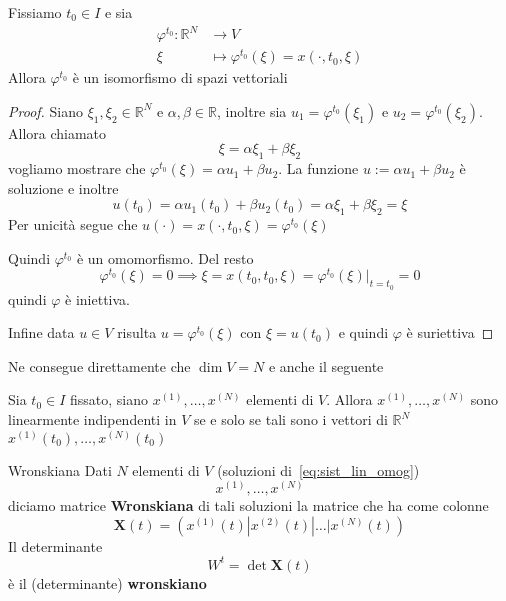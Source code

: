 \begin{proposition}
    Fissiamo \(t_{0} \in I\) e sia 
    \begin{align*}
        \varphi^{t_{0}}: \mathbb{R}^{N} &\longrightarrow V \\
        \xi &\longmapsto \varphi^{t_{0}}(\xi) = x{(\cdot , t_{0}, \xi)}
    \end{align*}
    Allora \(\varphi ^{t_{0}}\) è un isomorfismo di spazi vettoriali
\end{proposition}
\begin{proof}
    Siano \(\xi_{1}, \xi_{2} \in \mathbb{R}^{N}\) e \(\alpha, \beta \in
    \mathbb{R}\), inoltre sia \(u_{1} = \varphi ^{t_{0}}{(\xi_{1})}\) e \(u_{2}
    = \varphi ^{t_{0}}{(\xi_{2})}\). Allora chiamato
    \[
      \xi = \alpha \xi_{1} + \beta\xi_{2}
    \]
    vogliamo mostrare che \(\varphi ^{t_{0}}{(\xi)} = \alpha u_{1} + \beta
    u_{2}\). La funzione \(u := \alpha u_{1} + \beta u_{2}\) è soluzione e
    inoltre
    \[
      u{(t_{0})} = \alpha u_{1}{(t_{0})} + \beta u_{2}{(t_{0})} = \alpha
      \xi_{1} + \beta \xi_{2} = \xi
    \]
    Per unicità segue che \(u{(\cdot )} = x{(\cdot , t_{0}, \xi)} = \varphi
    ^{t_{0}}{(\xi)}\) 

    Quindi \(\varphi ^{t_{0}}\) è un omomorfismo. Del resto
    \[
      \varphi ^{t_{0}}{(\xi)} = 0 \implies \xi = x{(t_{0}, t_{0}, \xi)} =
      \varphi ^{t_{0}}{(\xi)}|_{t = t_{0}} = 0
    \]
    quindi \(\varphi \) è iniettiva.

    Infine data \(u \in V\)  risulta \(u =
    \varphi ^{t_{0}}{(\xi)}\) con \(\xi = u{(t_{0})}\) e quindi \(\varphi \) è
    suriettiva
\end{proof}
Ne consegue direttamente che \(\dim V = N\) e anche il seguente
\begin{corollary}
    Sia \(t_{0} \in I\) fissato, siano \(x^{{(1)}}, \dots, x^{{(N)}}\) elementi
    di \(V\). Allora \(x^{{(1)}}, \dots, x^{{(N)}}\) sono linearmente
    indipendenti in \(V\) se e solo se tali sono i vettori di \(\mathbb{R}^{N}\)
    \(x^{{(1)}}{(t_{0})}, \dots, x^{{(N)}}{(t_{0})}\) 
\end{corollary}

\begin{definition}{Wronskiana}
    Dati \(N\) elementi di \(V\) (soluzioni di~\eqref{eq:sist_lin_omog})
    \[
      x^{{(1)}}, \dots, x^{{(N)}}
    \] diciamo matrice \textbf{Wronskiana} di tali soluzioni la matrice che ha
    come colonne
    \[
        \mathbf{X}{(t)} = {(x^{{(1)}}{(t)} | x^{{(2)}}{(t)} | \dots |
        x^{{(N)}}{(t)})}
    \]
    Il determinante
    \[
      W^{t} = \det \mathbf{X}{(t)}
    \]
    è il (determinante) \textbf{wronskiano}
\end{definition}

